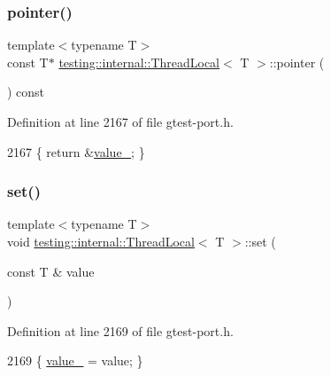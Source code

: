 \subsubsection{\texorpdfstring{pointer()}{pointer()}\hspace{0.1cm}{\footnotesize\ttfamily [2/2]}}
{\footnotesize\ttfamily template$<$typename T$>$ \\
const T$\ast$ \hyperlink{classtesting_1_1internal_1_1ThreadLocal}{testing\+::internal\+::\+Thread\+Local}$<$ T $>$\+::pointer (\begin{DoxyParamCaption}{ }\end{DoxyParamCaption}) const\hspace{0.3cm}{\ttfamily [inline]}}



Definition at line 2167 of file gtest-\/port.\+h.


\begin{DoxyCode}
2167 \{ \textcolor{keywordflow}{return} &\hyperlink{classtesting_1_1internal_1_1ThreadLocal_ae0db6b57bdb752feb343ee4d935708e2}{value\_}; \}
\end{DoxyCode}
\mbox{\label{classtesting_1_1internal_1_1ThreadLocal_ab5ebc7ba07426cef7167afa2a7707eb4}} 
\subsubsection{\texorpdfstring{set()}{set()}}
{\footnotesize\ttfamily template$<$typename T$>$ \\
void \hyperlink{classtesting_1_1internal_1_1ThreadLocal}{testing\+::internal\+::\+Thread\+Local}$<$ T $>$\+::set (\begin{DoxyParamCaption}\item[{const T \&}]{value }\end{DoxyParamCaption})\hspace{0.3cm}{\ttfamily [inline]}}



Definition at line 2169 of file gtest-\/port.\+h.


\begin{DoxyCode}
2169 \{ \hyperlink{classtesting_1_1internal_1_1ThreadLocal_ae0db6b57bdb752feb343ee4d935708e2}{value\_} = value; \}
\end{DoxyCode}


